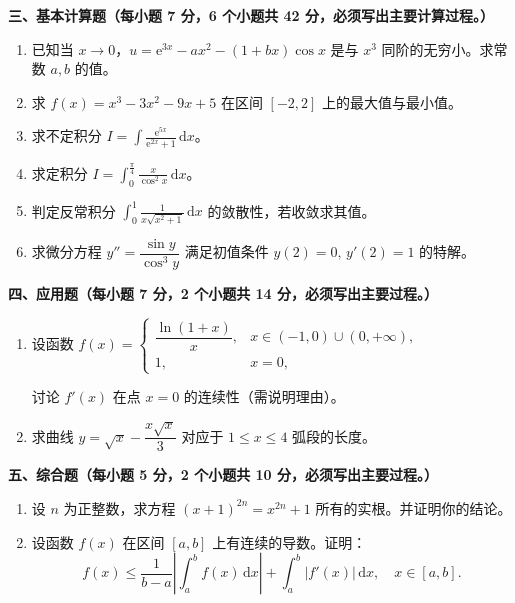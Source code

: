 \documentclass[a4paper,11pt]{ctexart}
\newcommand{\dd}{\,\mathrm{d}}
\newcommand{\e}{\mathrm{e}}
\begin{document}
\vspace{0.8em}

\textbf{三、基本计算题（每小题 7 分，6 个小题共 42 分，必须写出主要计算过程。）}

\begin{enumerate}[label=\arabic*., start=11, leftmargin=2em, itemsep=0.8em, topsep=0.5em]
  \item 已知当 $x\to 0$，$u=\e^{3x}-ax^2-(1+bx)\cos x$ 是与 $x^3$ 同阶的无穷小。求常数 $a,b$ 的值。

  \item 求 $f(x)=x^3-3x^2-9x+5$ 在区间 $[-2,2]$ 上的最大值与最小值。

  \item 求不定积分 $I=\displaystyle\int\frac{\e^{5x}}{\e^{2x}+1}\dd x$。

  \item 求定积分 $I=\displaystyle\int_0^{\frac{\pi}{4}}\frac{x}{\cos^2 x}\dd x$。

  \item 判定反常积分 $\displaystyle\int_0^1\frac{1}{x\sqrt{x^2+1}}\dd x$ 的敛散性，若收敛求其值。

  \item 求微分方程 $y''=\dfrac{\sin y}{\cos^3 y}$ 满足初值条件 $y(2)=0,\,y'(2)=1$ 的特解。
\end{enumerate}

\vspace{0.8em}

\textbf{四、应用题（每小题 7 分，2 个小题共 14 分，必须写出主要过程。）}

\begin{enumerate}[label=\arabic*., start=17, leftmargin=2em, itemsep=0.8em, topsep=0.5em]
  \item 设函数 $f(x)=\begin{cases}\dfrac{\ln(1+x)}{x}, & x\in(-1,0)\cup(0,+\infty),\\[0.5em] 1, & x=0,\end{cases}$

  讨论 $f'(x)$ 在点 $x=0$ 的连续性（需说明理由）。

  \item 求曲线 $y=\sqrt{x}-\dfrac{x\sqrt{x}}{3}$ 对应于 $1\le x\le 4$ 弧段的长度。
\end{enumerate}

\vspace{0.8em}

\textbf{五、综合题（每小题 5 分，2 个小题共 10 分，必须写出主要过程。）}

\begin{enumerate}[label=\arabic*., start=19, leftmargin=2em, itemsep=0.8em, topsep=0.5em]
  \item 设 $n$ 为正整数，求方程 $(x+1)^{2n}=x^{2n}+1$ 所有的实根。并证明你的结论。

  \item 设函数 $f(x)$ 在区间 $[a,b]$ 上有连续的导数。证明：
  \[
    f(x) \le \frac{1}{b-a}\left|\int_a^b f(x)\dd x\right| + \int_a^b |f'(x)|\dd x,\quad x\in[a,b].
  \]
\end{enumerate}
\end{document}

